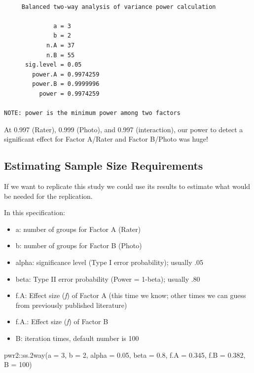 \documentclass[
  11pt,
]{book}
\newenvironment{Shaded}{\begin{snugshade}}{\end{snugshade}}
\newcommand{\AttributeTok}[1]{\textcolor[rgb]{0.77,0.63,0.00}{#1}}
\newcommand{\DecValTok}[1]{\textcolor[rgb]{0.00,0.00,0.81}{#1}}
\newcommand{\FloatTok}[1]{\textcolor[rgb]{0.00,0.00,0.81}{#1}}
\newcommand{\FunctionTok}[1]{\textcolor[rgb]{0.00,0.00,0.00}{#1}}
\newcommand{\NormalTok}[1]{#1}
\newcommand{\SpecialCharTok}[1]{\textcolor[rgb]{0.00,0.00,0.00}{#1}}
\providecommand{\tightlist}{%
  \setlength{\itemsep}{0pt}\setlength{\parskip}{0pt}}
\begin{document}
\begin{verbatim}

     Balanced two-way analysis of variance power calculation 

              a = 3
              b = 2
            n.A = 37
            n.B = 55
      sig.level = 0.05
        power.A = 0.9974259
        power.B = 0.9999996
          power = 0.9974259

NOTE: power is the minimum power among two factors
\end{verbatim}

At 0.997 (Rater), 0.999 (Photo), and 0.997 (interaction), our power to detect a significant effect for Factor A/Rater and Factor B/Photo was huge!

\hypertarget{estimating-sample-size-requirements}{%
\subsection{Estimating Sample Size Requirements}\label{estimating-sample-size-requirements}}

If we want to replicate this study we could use its results to estimate what would be needed for the replication.

In this specification:

\begin{itemize}
\tightlist
\item
  a: number of groups for Factor A (Rater)
\item
  b: number of groups for Factor B (Photo)
\item
  alpha: significance level (Type I error probability); usually .05
\item
  beta: Type II error probability (Power = 1-beta); usually .80
\item
  f.A: Effect size (\emph{f}) of Factor A (this time we know; other times we can guess from previously published literature)
\item
  f.A.: Effect size (\emph{f}) of Factor B
\item
  B: iteration times, default number is 100
\end{itemize}

\begin{Shaded}
\begin{Highlighting}[]
\NormalTok{pwr2}\SpecialCharTok{::}\FunctionTok{ss.2way}\NormalTok{(}\AttributeTok{a =} \DecValTok{3}\NormalTok{, }\AttributeTok{b =} \DecValTok{2}\NormalTok{, }\AttributeTok{alpha =} \FloatTok{0.05}\NormalTok{, }\AttributeTok{beta =} \FloatTok{0.8}\NormalTok{, }\AttributeTok{f.A =} \FloatTok{0.345}\NormalTok{, }\AttributeTok{f.B =} \FloatTok{0.382}\NormalTok{,}
    \AttributeTok{B =} \DecValTok{100}\NormalTok{)}
\end{Highlighting}
\end{Shaded}
\end{document}
